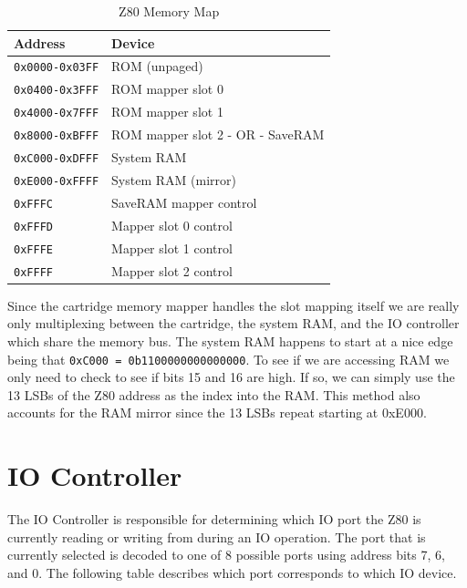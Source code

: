 \documentclass{article}
\begin{document}
\begin{table}[H]
    \centering
    \begin{tabular}{ll}
        \toprule
        \textbf{Address} & \textbf{Device} \\
        \midrule
        \texttt{0x0000-0x03FF} & ROM (unpaged)                    \\
        \texttt{0x0400-0x3FFF} & ROM mapper slot 0                \\
        \texttt{0x4000-0x7FFF} & ROM mapper slot 1                \\
        \texttt{0x8000-0xBFFF} & ROM mapper slot 2 - OR - SaveRAM \\
        \texttt{0xC000-0xDFFF} & System RAM                       \\
        \texttt{0xE000-0xFFFF} & System RAM (mirror)              \\
        \texttt{0xFFFC}       & SaveRAM mapper control           \\
        \texttt{0xFFFD}       & Mapper slot 0 control            \\
        \texttt{0xFFFE}       & Mapper slot 1 control            \\
        \texttt{0xFFFF}       & Mapper slot 2 control            \\
        \bottomrule
    \end{tabular}
    \fontfamily{}\selectfont
    \caption{Z80 Memory Map \protect\cite{mem_map_table}}
\end{table}

Since the cartridge memory mapper handles the slot mapping itself we are really
only multiplexing between the cartridge, the system RAM, and the IO controller
which share the memory bus.  The system RAM happens to start at a nice edge
being that \texttt{0xC000 = 0b1100000000000000}. To see if we are accessing RAM
we only need to check to see if bits 15 and 16 are high. If so, we can simply
use the 13 LSBs of the Z80 address as the index into the RAM.  This method also
accounts for the RAM mirror since the 13 LSBs repeat starting at 0xE000.

\section{IO Controller}

The IO Controller is responsible for determining which IO port
the Z80 is currently reading or writing from during an IO operation.
The port that is currently selected is decoded to one of 8 possible
ports using address bits 7, 6, and 0. The following table describes
which port corresponds to which IO device.
\end{document}
